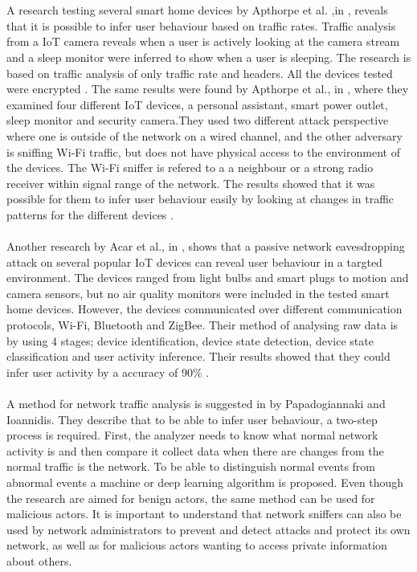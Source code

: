 \\\\
A research testing several smart home devices by Apthorpe et al. ,in \cite{SpyingonSmartHomes}, reveals that it is possible to infer user behaviour based on traffic rates. Traffic analysis from a IoT camera reveals when a user is actively looking at the camera stream and a sleep monitor were inferred to show when a user is sleeping. The research is based on traffic analysis of only traffic rate and headers. All the devices tested were encrypted \cite{SpyingonSmartHomes}. The same results were found by Apthorpe et al., in \cite{WiFiSniffInfer}, where they examined four different IoT devices, a personal assistant, smart power outlet, sleep monitor and security camera.They used two different attack perspective where one is outside of the network on a wired channel, and the other adversary is sniffing Wi-Fi traffic, but does not have physical access to the environment of the devices. The Wi-Fi sniffer is refered to a a neighbour or a strong radio receiver within signal range of the network. The results showed that it was possible for them to infer user behaviour easily by looking at changes in traffic patterns for the different devices \cite{WiFiSniffInfer}. 
\\\\
Another research by Acar et al., in \cite{PeakaBoo}, shows that a passive network eavesdropping attack on several popular IoT devices can reveal user behaviour in a targted environment. The devices ranged from light bulbs and smart plugs to motion and camera sensors, but no air quality monitors were included in the tested smart home devices. However, the devices communicated over different communication protocols, Wi-Fi, Bluetooth and ZigBee. Their method of analysing raw data is by using 4 stages; device identification, device state detection, device state classification and user activity inference. Their results showed that they could infer user activity by a accuracy of 90\% \cite{PeakaBoo}. 
\\\\
A method for network traffic analysis is suggested in \cite{NetAna} by Papadogiannaki and Ioannidis. They describe that to be able to infer user behaviour, a two-step process is required. First, the analyzer needs to know what normal network activity is and then compare it collect data when there are changes from the normal traffic is the network. To be able to distinguish normal events from abnormal events a machine or deep learning algorithm is proposed. Even though the research are aimed for benign actors, the same method can be used for malicious actors. It is important to understand that network sniffers can also be used by network administrators to prevent and detect attacks and protect its own network, as well as for malicious actors wanting to access private information about others. 